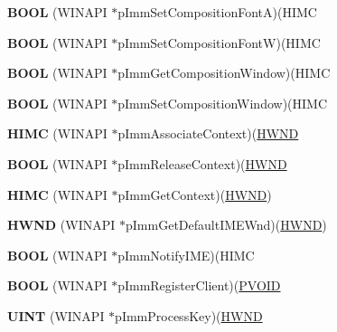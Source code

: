 \begin{DoxyCompactItemize}
{\bfseries B\+O\+OL} (W\+I\+N\+A\+PI $\ast$p\+Imm\+Set\+Composition\+FontA)(H\+I\+MC
\item 
\mbox{\label{struct_imm32_api_table_ae221750b21e1f61fa13a67295baa879d}} 
{\bfseries B\+O\+OL} (W\+I\+N\+A\+PI $\ast$p\+Imm\+Set\+Composition\+FontW)(H\+I\+MC
\item 
\mbox{\label{struct_imm32_api_table_a753041c612c4390761c823b371308b74}} 
{\bfseries B\+O\+OL} (W\+I\+N\+A\+PI $\ast$p\+Imm\+Get\+Composition\+Window)(H\+I\+MC
\item 
\mbox{\label{struct_imm32_api_table_aadad3179ec702d2297d490fa7023867e}} 
{\bfseries B\+O\+OL} (W\+I\+N\+A\+PI $\ast$p\+Imm\+Set\+Composition\+Window)(H\+I\+MC
\item 
\mbox{\label{struct_imm32_api_table_af17c9e1616949618d3234fcd8c6aaebd}} 
{\bfseries H\+I\+MC} (W\+I\+N\+A\+PI $\ast$p\+Imm\+Associate\+Context)(\hyperlink{interfacevoid}{H\+W\+ND}
\item 
\mbox{\label{struct_imm32_api_table_af9ec22a9d14577a2268f0b58ceea8b28}} 
{\bfseries B\+O\+OL} (W\+I\+N\+A\+PI $\ast$p\+Imm\+Release\+Context)(\hyperlink{interfacevoid}{H\+W\+ND}
\item 
\mbox{\label{struct_imm32_api_table_a7f23e2f86bcc41741d09e9db383c490a}} 
{\bfseries H\+I\+MC} (W\+I\+N\+A\+PI $\ast$p\+Imm\+Get\+Context)(\hyperlink{interfacevoid}{H\+W\+ND})
\item 
\mbox{\label{struct_imm32_api_table_a3f753c054658826a283a5bd92460e39a}} 
{\bfseries H\+W\+ND} (W\+I\+N\+A\+PI $\ast$p\+Imm\+Get\+Default\+I\+M\+E\+Wnd)(\hyperlink{interfacevoid}{H\+W\+ND})
\item 
\mbox{\label{struct_imm32_api_table_ac79879e398142f67bd0fea2f8f7cc22b}} 
{\bfseries B\+O\+OL} (W\+I\+N\+A\+PI $\ast$p\+Imm\+Notify\+I\+ME)(H\+I\+MC
\item 
\mbox{\label{struct_imm32_api_table_af309e030918f505fd2c5ba0d18ec812b}} 
{\bfseries B\+O\+OL} (W\+I\+N\+A\+PI $\ast$p\+Imm\+Register\+Client)(\hyperlink{interfacevoid}{P\+V\+O\+ID}
\item 
\mbox{\label{struct_imm32_api_table_a5857619c9e3d9a568d1806bec18b88cf}} 
{\bfseries U\+I\+NT} (W\+I\+N\+A\+PI $\ast$p\+Imm\+Process\+Key)(\hyperlink{interfacevoid}{H\+W\+ND}
\end{DoxyCompactItemize}
